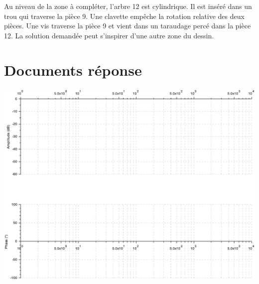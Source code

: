 Au niveau de la zone à compléter, l'arbre 12 est cylindrique. Il est inséré dans un trou qui traverse la pièce 9. Une clavette empêche la rotation relative des deux pièces. Une vis traverse la pièce 9 et vient dans un taraudage percé dans la pièce 12. La solution demandée peut s'inspirer d'une autre zone du dessin.


\cleardoublepage

\pagestyle{documentreponse}

\section{Documents réponse}




\newpage




\newpage





\newpage




\newpage




\newpage


\begin{center}
	\includegraphics[width=0.9\linewidth]{img/bode2}
\end{center}


